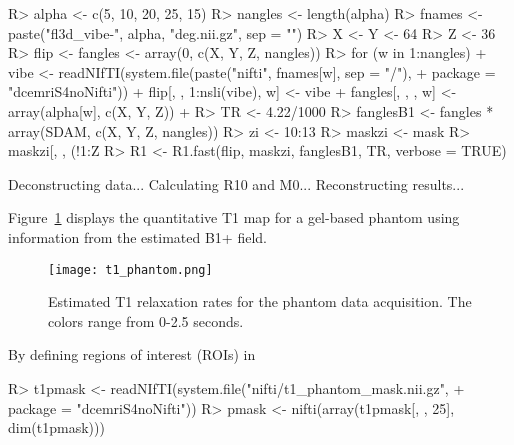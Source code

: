 \documentclass[article]{jss}
\begin{document}
\begin{Schunk}
\begin{Sinput}
R> alpha <- c(5, 10, 20, 25, 15)
R> nangles <- length(alpha)
R> fnames <- paste("fl3d_vibe-", alpha, "deg.nii.gz", sep = "")
R> X <- Y <- 64
R> Z <- 36
R> flip <- fangles <- array(0, c(X, Y, Z, nangles))
R> for (w in 1:nangles) {
+     vibe <- readNIfTI(system.file(paste("nifti", fnames[w], sep = "/"), 
+         package = "dcemriS4noNifti"))
+     flip[, , 1:nsli(vibe), w] <- vibe
+     fangles[, , , w] <- array(alpha[w], c(X, Y, Z))
+ }
R> TR <- 4.22/1000
R> fanglesB1 <- fangles * array(SDAM, c(X, Y, Z, nangles))
R> zi <- 10:13
R> maskzi <- mask
R> maskzi[, , (!1:Z %in% zi)] <- FALSE
R> R1 <- R1.fast(flip, maskzi, fanglesB1, TR, verbose = TRUE)
\end{Sinput}
\begin{Soutput}
  Deconstructing data...
  Calculating R10 and M0...
  Reconstructing results...
\end{Soutput}
\end{Schunk}
\begin{Schunk}
\end{Schunk}

Figure~\ref{fig:t1-phantom} displays the quantitative T1 map for a
gel-based phantom using information from the estimated B1+ field.

\begin{figure}[!htbp]
  \centering
  \texttt{[image: t1\_phantom.png]}
  \caption{Estimated T1 relaxation rates for the phantom data
  acquisition.  The colors range from 0-2.5 seconds.}
  \label{fig:t1-phantom}
\end{figure}

By defining regions of interest (ROIs) in 

\begin{Schunk}
\begin{Sinput}
R> t1pmask <- readNIfTI(system.file("nifti/t1_phantom_mask.nii.gz", 
+     package = "dcemriS4noNifti"))
R> pmask <- nifti(array(t1pmask[, , 25], dim(t1pmask)))
\end{Sinput}
\end{Schunk}
\end{document}
